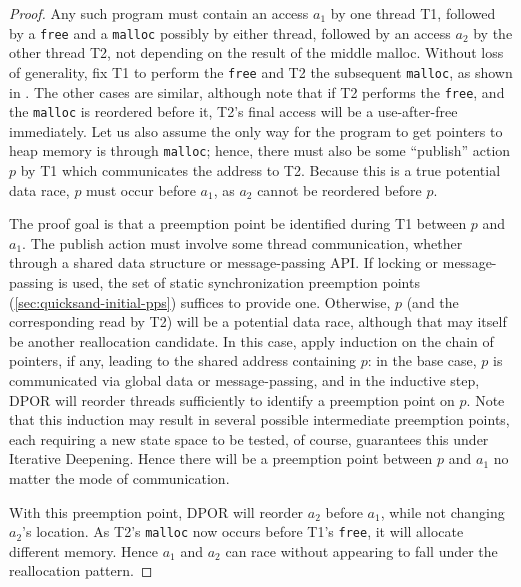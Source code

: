 \begin{proof}
Any such program must contain an access $a_1$ by one thread T1,
followed by a {\tt free} and a {\tt malloc} possibly by either thread,
followed by an access $a_2$ by the other thread T2,
not depending on the result of the middle malloc.
Without loss of generality, fix T1 to perform the {\tt free} and T2 the subsequent {\tt malloc},
as shown in .
The other cases are similar,
although note that if T2 performs the {\tt free},
and the {\tt malloc} is reordered before it,
T2's final access will be a use-after-free immediately.
Let us also assume the only way for the program to get pointers to heap memory is through {\tt malloc};
hence, there must also be some ``publish'' action $p$ by T1 which communicates the address to T2.
Because this is a true potential data race,
$p$ must occur before $a_1$, as $a_2$ cannot be reordered before $p$.

The proof goal is that a preemption point be identified during T1 between $p$ and $a_1$.
The publish action must involve some thread communication,
whether through a shared data structure or message-passing API.
If locking or message-passing is used, the set of static synchronization preemption points
(\cref{sec:quicksand-initial-pps})
suffices to provide one.
Otherwise, $p$ (and the corresponding read by T2) will be a potential data race,
although that may itself be another reallocation candidate.
In this case, apply induction on the chain of pointers, if any, leading to the shared address containing $p$:
in the base case, $p$ is communicated via global data or message-passing,
and in the inductive step, DPOR will reorder threads sufficiently to identify a preemption point on $p$.
Note that this induction may result in several possible intermediate preemption points,
each requiring a new state space to be tested,
of course,  guarantees this under Iterative Deepening.
Hence there will be a preemption point between $p$ and $a_1$ no matter the mode of communication.

With this preemption point,
DPOR will reorder $a_2$ before $a_1$, while not changing $a_2$'s location.
As T2's {\tt malloc} now occurs before T1's {\tt free}, it will allocate different memory.
Hence $a_1$ and $a_2$ %
can race without appearing to fall under the reallocation pattern.
\end{proof}

